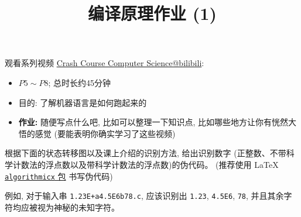 \documentclass[a4paper, justified]{tufte-handout}
\title{编译原理作业 (1)}
\date{\zhtoday}
\begin{document}
\maketitle
\noplagiarism %
\begin{abstract}
\end{abstract}
\beginrequired
\begin{problem}
  观看系列视频 \href{https://www.bilibili.com/video/BV1EW411u7th?}{Crash Course Computer Science@bilibili}:
  \begin{itemize}
    \item $P5 \sim P8$; 总时长约45分钟
    \item 目的: 了解机器语言是如何跑起来的
    \item {\bf 作业:} 随便写点什么吧, 比如可以整理一下知识点, 比如哪些地方让你有恍然大悟的感觉
    (要能表明你确实学习了这些视频)
  \end{itemize}
\end{problem}

\begin{solution}
\end{solution}

\begin{problem}
  根据下面的状态转移图以及课上介绍的识别方法, 给出识别数字
  (正整数、不带科学计数法的浮点数以及带科学计数法的浮点数)的伪代码。
  (推荐使用 \LaTeX{}
  \href{http://tug.ctan.org/macros/latex/contrib/algorithmicx/algorithmicx.pdf}{\texttt{algorithmicx} 包}
  书写伪代码)


  例如, 对于输入串 \texttt{1.23E+a4.5E6b78.c},
  应该识别出 \texttt{1.23}, \texttt{4.5E6}, \texttt{78},
  并且其余字符均应被视为神秘的未知字符。
\end{problem}

\begin{solution}
\end{solution}
\end{document}
